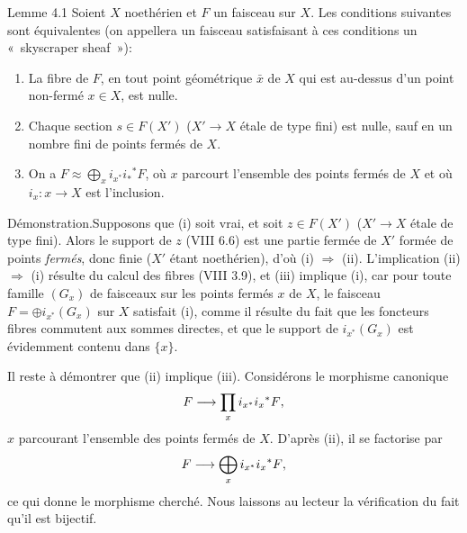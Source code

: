 \documentclass[10pt]{../fichiers-configuration-latex/smfart}
\begin{document}
\begin{enonce*}{Lemme 4.1}
Soient $X$ noethérien et $F$ un faisceau sur $X$. Les conditions
suivantes sont équivalentes (on appellera un faisceau satisfaisant à
ces conditions un « skyscraper sheaf »):
\begin{enumerate}
\renewcommand{\theenumi}{\roman{enumi}}
\renewcommand{\labelenumi}{(\theenumi)}
\item La fibre de $F$, en tout point géométrique $\bar{x}$ de $X$ qui
est au-dessus d'un point non-fermé $x\in X$, est nulle.

\item Chaque section $s\in F(X')$ ($X'\rightarrow X$ étale de type
fini) est nulle, sauf en un nombre fini de points fermés de $X$.

\item On a $F\approx ⨁_x i_{x^{\ast}}i_{\ast}{}^{\ast}F$, où $x$
parcourt l'ensemble des points fermés de $X$ et où $i_x:x\rightarrow
X$ est l'inclusion.
\end{enumerate}
\end{enonce*}

Démonstration.\pageoriginale Supposons que (i) soit vrai, et soit
$z\in F(X')$ ($X'\rightarrow X$ étale de type fini). Alors le support
de $z$ (VIII 6.6) est une partie fermée de $X'$ formée de points
\emph{fermés}, donc finie ($X'$ étant noethérien), d'où (i)
$\Rightarrow$ (ii). L'implication (ii) $\Rightarrow$ (i) résulte du
calcul des fibres (VIII 3.9), et (iii) implique (i), car pour toute
famille $(G_x)$ de faisceaux sur les points fermés $x$ de $X$, le
faisceau $F=\oplus i_{x^{\ast}}(G_x)$ sur $X$ satisfait (i), comme il
résulte du fait que les foncteurs fibres commutent aux sommes
directes, et que le support de $i_{x^{\ast}}(G_x)$ est évidemment
contenu dans $\{x\}$.

Il reste à démontrer que (ii) implique (iii). Considérons le morphisme
canonique
$$
F\longrightarrow \prod_x i_{x^{\ast}}i_{x}{}^\ast F{},
$$
$x$ parcourant l'ensemble des points fermés de $X$. D'après (ii), il
se factorise par
$$
F\longrightarrow \bigoplus_x i_{x^{\ast}}i_x{}^\ast F{},
$$
ce qui donne le morphisme cherché. Nous laissons au lecteur la
vérification du fait qu'il est bijectif.

\setcounter{subsection}{1}
\end{document}
